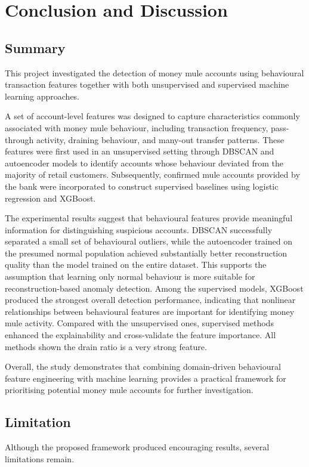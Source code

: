 \chapter{Conclusion and Discussion}
\section{Summary}
This project investigated the detection of money mule accounts using behavioural
transaction features together with both unsupervised and supervised machine learning
approaches.

A set of account-level features was designed to capture characteristics commonly
associated with money mule behaviour, including transaction frequency, pass-through
activity, draining behaviour, and many-out transfer patterns. These features were first
used in an unsupervised setting through DBSCAN and autoencoder models to identify
accounts whose behaviour deviated from the majority of retail customers. Subsequently,
confirmed mule accounts provided by the bank were incorporated to construct supervised
baselines using logistic regression and XGBoost.

The experimental results suggest that behavioural features provide meaningful
information for distinguishing suspicious accounts. DBSCAN successfully separated a
small set of behavioural outliers, while the autoencoder trained on the presumed normal
population achieved substantially better reconstruction quality than the model trained on
the entire dataset. This supports the assumption that learning only normal behaviour is
more suitable for reconstruction-based anomaly detection. Among the supervised models,
XGBoost produced the strongest overall detection performance, indicating that nonlinear
relationships between behavioural features are important for identifying money mule
activity. Compared with the unsupervised ones, supervised methods enhanced the explainability and cross-validate the feature importance. All methods shown the drain ratio is a very strong feature.

Overall, the study demonstrates that combining domain-driven behavioural feature
engineering with machine learning provides a practical framework for prioritising
potential money mule accounts for further investigation.
\section{Limitation}
Although the proposed framework produced encouraging results, several limitations
remain.

